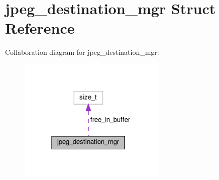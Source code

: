 \hypertarget{structjpeg__destination__mgr}{}\section{jpeg\+\_\+destination\+\_\+mgr Struct Reference}
\label{structjpeg__destination__mgr}


Collaboration diagram for jpeg\+\_\+destination\+\_\+mgr\+:
\nopagebreak
\begin{figure}[H]
\begin{center}
\leavevmode
\includegraphics[width=198pt]{structjpeg__destination__mgr__coll__graph}
\end{center}
\end{figure}
